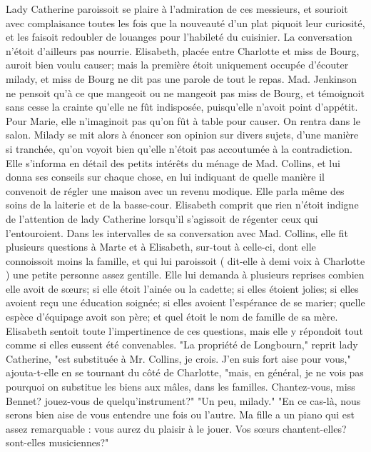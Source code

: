 Lady Catherine paroissoit se plaire à l'admiration de ces messieurs, et sourioit avec\setcounter{page}{533} complaisance toutes les fois que la nouveauté d'un plat piquoit leur curiosité, et les faisoit redoubler de louanges pour l'habileté du cuisinier. La conversation n'étoit d'ailleurs pas nourrie. Elisabeth, placée entre Charlotte et miss de Bourg, auroit bien voulu causer; mais la première étoit uniquement occupée d'écouter milady, et miss de Bourg ne dit pas une parole de tout le repas. Mad. Jenkinson ne pensoit qu'à ce que mangeoit ou ne mangeoit pas miss de Bourg, et témoignoit sans cesse la crainte qu'elle ne fût indisposée, puisqu'elle n'avoit point d'appétit. Pour Marie, elle n'imaginoit pas qu'on fût à table pour causer.
On rentra dans le salon. Milady se mit alors à énoncer son opinion sur divers sujets, d'une manière si tranchée, qu'on voyoit bien qu'elle n'étoit pas accoutumée à la contradiction. Elle s'informa en détail des petits intérêts du ménage de Mad. Collins, et lui donna ses conseils sur chaque chose, en lui indiquant de quelle manière il convenoit de régler une maison avec un revenu modique. Elle parla même des soins de la laiterie et de la basse-cour. Elisabeth comprit que rien n'étoit indigne de l'attention de lady Catherine lorsqu'il s'agissoit de régenter ceux qui l'entouroient. Dans les intervalles\setcounter{page}{534} de sa conversation avec Mad. Collins, elle fit plusieurs questions à Marte et à Elisabeth, sur-tout à celle-ci, dont elle connoissoit moins la famille, et qui lui paroissoit ( dit-elle à demi voix à Charlotte ) une petite personne assez gentille. Elle lui demanda à plusieurs reprises combien elle avoit de sœurs; si elle étoit l’ainée ou la cadette; si elles étoient jolies; si elles avoient reçu une éducation soignée; si elles avoient l’espérance de se marier; quelle espèce d’équipage avoit son père; et quel étoit le nom de famille de sa mère. Elisabeth sentoit toute l’impertinence de ces questions, mais elle y répondoit tout comme si elles eussent été convenables.
"La propriété de Longbourn," reprit lady Catherine, "est substituée à Mr. Collins, je crois. J’en suis fort aise pour vous," ajouta-t-elle en se tournant du côté de Charlotte, "mais, en général, je ne vois pas pourquoi on substitue les biens aux mâles, dans les familles. Chantez-vous, miss Bennet? jouez-vous de quelqu’instrument?"
"Un peu, milady."
"En ce cas-là, nous serons bien aise de vous entendre une fois ou l’autre. Ma fille a un piano qui est assez remarquable : vous aurez du plaisir à le jouer. Vos sœurs chantent-elles?\setcounter{page}{535}  sont-elles musiciennes?"
